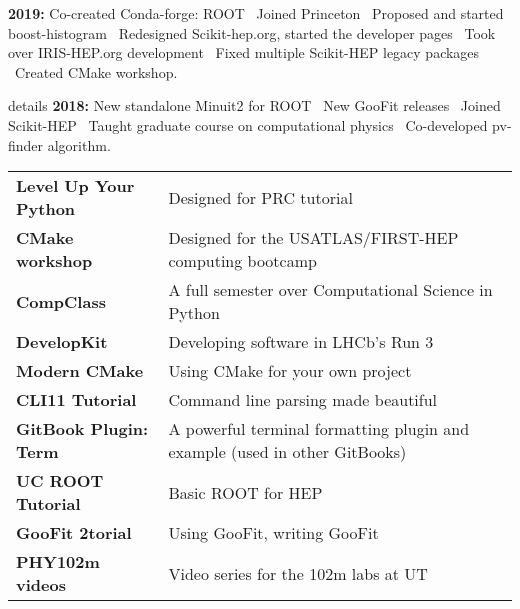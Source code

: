 \documentclass[10pt,letterpaper]{moderncv}
\begin{document}
\textbf{2019:}
Co-created Conda-forge: ROOT \textbullet\
Joined Princeton \textbullet\
Proposed and started boost-histogram \textbullet\
Redesigned Scikit-hep.org, started the developer pages \textbullet\
Took over IRIS-HEP.org development \textbullet\
Fixed multiple Scikit-HEP legacy packages \textbullet\ Created CMake workshop.

\begin{taggedblock}{details}
\textbf{2018:} New standalone Minuit2 for ROOT \textbullet\
New GooFit releases \textbullet\
Joined Scikit-HEP \textbullet\
Taught graduate course on computational physics \textbullet\
Co-developed pv-finder algorithm.
\end{taggedblock}


\begin{tabularx}{\textwidth}{>{\bfseries}p{1.6in}X}
Level Up Your Python & Designed for PRC tutorial \\
CMake workshop & Designed for the USATLAS/FIRST-HEP computing bootcamp \\
CompClass & A full semester over Computational Science in Python \\
DevelopKit & Developing software in LHCb’s Run 3 \\
Modern CMake & Using CMake for your own project \\
CLI11 Tutorial & Command line parsing made beautiful \\
GitBook Plugin: Term & A powerful terminal formatting plugin and example (used in other GitBooks) \\
UC ROOT Tutorial & Basic ROOT for HEP \\
GooFit 2torial & Using GooFit, writing GooFit \\
PHY102m videos & Video series for the 102m labs at UT \\
\end{tabularx}

\mysection{Selected websites}
\end{document}
